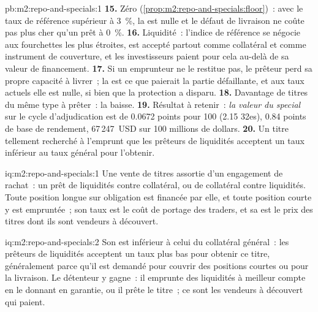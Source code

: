 \begin{solution}{pb:m2:repo-and-specials:1}
\textbf{15.} Zéro (\cref{prop:m2:repo-and-specials:floor})~: avec le taux de référence
supérieur à 3~\%, la  est nulle et le défaut de livraison ne coûte pas plus cher
qu'un prêt à 0~\%.
\textbf{16.} Liquidité~: l'indice de référence se négocie aux fourchettes les plus étroites, est
accepté partout comme collatéral et comme instrument de couverture, et les investisseurs paient pour cela
au-delà de sa valeur de financement.
\textbf{17.} Si un emprunteur ne le restitue pas, le prêteur perd sa propre capacité
à livrer~; la  est ce que paierait la partie défaillante, et aux
taux actuels elle est nulle, si bien que la protection a disparu.
\textbf{18.} Davantage de titres du même type à prêter~: la  baisse.
\textbf{19.} Résultat à retenir~: \emph{la valeur du special} sur le cycle
d'adjudication est de 0.0672 points pour 100 (2.15 32es), 0.84 points de base de rendement, 67\,247~USD
sur 100 millions de dollars.
\textbf{20.} Un titre tellement recherché à l'emprunt que les prêteurs de liquidités
acceptent un taux inférieur au taux général pour l'obtenir.
\end{solution}

\begin{solution}{iq:m2:repo-and-specials:1}
Une vente de titres assortie d'un engagement de rachat~: un prêt de liquidités contre
collatéral, ou de collatéral contre liquidités. Toute position longue sur obligation est
financée par elle, et toute position courte y est empruntée~; son taux est le
coût de portage des traders, et sa  est le prix des titres dont ils sont
vendeurs à découvert.
\end{solution}

\begin{solution}{iq:m2:repo-and-specials:2}
Son  est inférieur à celui du collatéral général~: les prêteurs de liquidités acceptent un
taux plus bas pour obtenir ce titre, généralement parce qu'il est demandé pour couvrir
des positions courtes ou pour la livraison. Le détenteur y gagne~: il emprunte des liquidités à meilleur compte
en le donnant en garantie, ou il prête le titre~; ce sont les vendeurs à découvert qui paient.
\end{solution}

